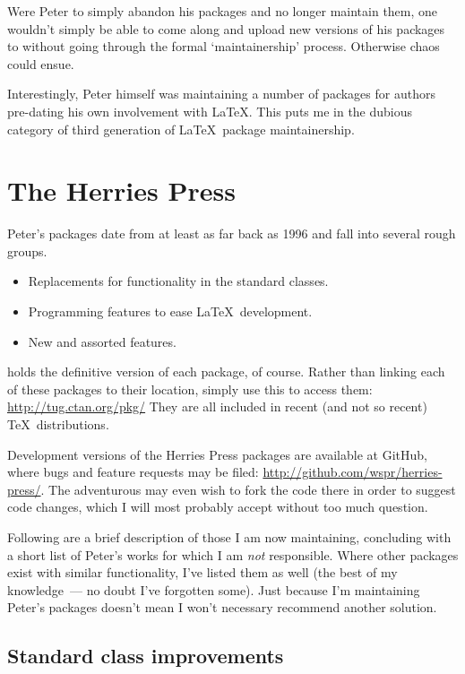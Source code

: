 \documentclass{ltugboat}
\begin{document}
Were Peter to simply abandon his packages and no longer maintain them, one wouldn't simply be able to come along and upload new versions of his packages to  without going through the formal `maintainership' process. Otherwise chaos could ensue.

Interestingly, Peter himself was maintaining a number of packages for authors pre-dating his own involvement with \LaTeX. This puts me in the dubious category of third generation of \LaTeX\ package maintainership.

\section{The Herries Press}

Peter's packages date from at least as far back as 1996 and fall into several rough groups.
\begin{itemize}
\item Replacements for functionality in the standard classes.
\item Programming features to ease \LaTeX\ development.
\item New and assorted features.
\end{itemize}
 holds the definitive version of each package, of course. Rather than linking each of these packages to their  location, simply use this  to access them: \url{http://tug.ctan.org/pkg/}
They are all included in recent (and not so recent) \TeX\ distributions.

Development versions of the Herries Press packages are available at GitHub, where bugs and feature requests may be filed: \url{http://github.com/wspr/herries-press/}. The adventurous may even wish to fork the code there in order to suggest code changes, which I will most probably accept without too much question.

Following are a brief description of those I am now maintaining, concluding with a short list of Peter's works for which I am \emph{not} responsible. Where other packages exist with similar functionality, I've listed them as well (the best of my knowledge~--- no doubt I've forgotten some). Just because I'm maintaining Peter's packages doesn't mean I won't necessary recommend another solution.

\subsection{Standard class improvements}
\end{document}

